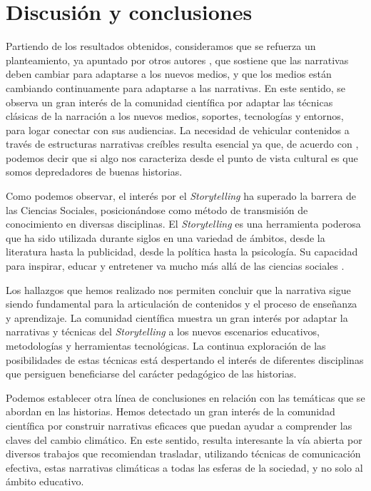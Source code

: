\section{Discusión y conclusiones}\label{sec-discusiónyconclusiones}

Partiendo de los resultados obtenidos, consideramos que se refuerza un
planteamiento, ya apuntado por otros autores \cite{alfian_role_2021,sidorenko-bautista_use_2020}, que
sostiene que las narrativas deben cambiar para adaptarse a los nuevos
medios, y que los medios están cambiando continuamente para adaptarse a
las narrativas. En este sentido, se observa un gran interés de la
comunidad científica por adaptar las técnicas clásicas de la narración a
los nuevos medios, soportes, tecnologías y entornos, para logar conectar
con sus audiencias. La necesidad de vehicular contenidos a través de
estructuras narrativas creíbles resulta esencial ya que, de acuerdo con
\cite{vergara2020herramientas}, podemos decir que si algo nos
caracteriza desde el punto de vista cultural es que somos depredadores
de buenas historias.

Como podemos observar, el interés por el \emph{Storytelling} ha superado
la barrera de las Ciencias Sociales, posicionándose como método de
transmisión de conocimiento en diversas disciplinas. El
\emph{Storytelling} es una herramienta poderosa que ha sido utilizada
durante siglos en una variedad de ámbitos, desde la literatura hasta la
publicidad, desde la política hasta la psicología. Su capacidad para
inspirar, educar y entretener va mucho más allá de las ciencias sociales
\cite{haven_story_2007}.

Los hallazgos que hemos realizado nos permiten concluir que la narrativa
sigue siendo fundamental para la articulación de contenidos y el proceso
de enseñanza y aprendizaje. La comunidad científica muestra un gran
interés por adaptar la narrativas y técnicas del \emph{Storytelling} a
los nuevos escenarios educativos, metodologías y herramientas
tecnológicas. La continua exploración de las posibilidades de estas
técnicas está despertando el interés de diferentes disciplinas que
persiguen beneficiarse del carácter pedagógico de las historias.

Podemos establecer otra línea de conclusiones en relación con las
temáticas que se abordan en las historias. Hemos detectado un gran
interés de la comunidad científica por construir narrativas eficaces que
puedan ayudar a comprender las claves del cambio climático. En este
sentido, resulta interesante la vía abierta por diversos trabajos \cite{arnoud_climate_2018,bloomfield_climate_2021,de_meyer_transforming_2021,moezzi_using_2017} que recomiendan trasladar, utilizando
técnicas de comunicación efectiva, estas narrativas climáticas a todas
las esferas de la sociedad, y no solo al ámbito educativo.

